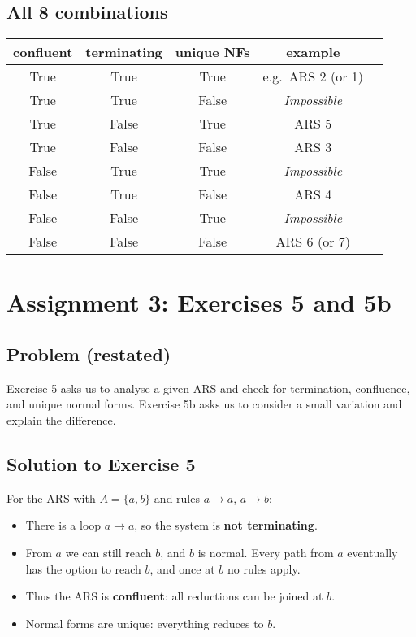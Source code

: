 \documentclass[11pt]{article}
\begin{document}
\subsection*{All 8 combinations}
\begin{tabular}{@{}ccccl@{}}
\toprule
confluent & terminating & unique NFs & example \\
\midrule
True  & True  & True  & e.g.\ ARS 2 (or 1) \\
True  & True  & False & \textit{Impossible} \\
True  & False & True  & ARS 5 \\
True  & False & False & ARS 3 \\
False & True  & True  & \textit{Impossible} \\
False & True  & False & ARS 4 \\
False & False & True  & \textit{Impossible} \\
False & False & False & ARS 6 (or 7) \\
\bottomrule
\end{tabular}

\section{Assignment 3: Exercises 5 and 5b}

\subsection*{Problem (restated)}
Exercise 5 asks us to analyse a given ARS and check for termination, confluence,
and unique normal forms.  
Exercise 5b asks us to consider a small variation and explain the difference.

\subsection*{Solution to Exercise 5}
For the ARS with $A=\{a,b\}$ and rules $a\to a$, $a\to b$:
\begin{itemize}
  \item There is a loop $a\to a$, so the system is \textbf{not terminating}.
  \item From $a$ we can still reach $b$, and $b$ is normal. Every path from $a$
    eventually has the option to reach $b$, and once at $b$ no rules apply.
  \item Thus the ARS is \textbf{confluent}: all reductions can be joined at $b$.
  \item Normal forms are unique: everything reduces to $b$.
\end{itemize}
\end{document}
